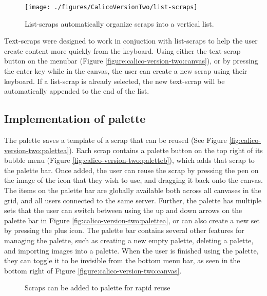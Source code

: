 \begin{figure*}[tbh]
  \centering
  \texttt{[image: ./figures/CalicoVersionTwo/list-scraps]}
  \caption{List-scraps automatically organize scraps into a vertical list.}
  \label{figure:calico-version-two:list-scraps}
\end{figure*}

Text-scraps were designed to work in conjuction with list-scraps to help the user create content more quickly from the keyboard. Using either the text-scrap button on the menubar (Figure \ref{figure:calico-version-two:canvas}), or by pressing the enter key while in the canvas, the user can create a new scrap using their keyboard. If a list-scrap is already selected, the new text-scrap will be automatically appended to the end of the list.

\subsection{Implementation of palette}

The palette saves a template of a scrap that can be reused (See Figure \ref{fig:calico-version-two:palettea}). Each scrap contains a palette button on the top right of its bubble menu (Figure \ref{fig:calico-version-two:paletteb}), which adds that scrap to the palette bar. Once added, the user can reuse the scrap by pressing the pen on the image of the icon that they wish to use, and dragging it back onto the canvas. The items on the palette bar are globally available both across all canvases in the grid, and all users connected to the same server. Further, the palette has multiple sets that the user can switch between using the up and down arrows on the palette bar in Figure \ref{fig:calico-version-two:palettea}, or can also create a new set by pressing the plus icon. The palette bar contains several other features for managing the palette, such as creating a new empty palette, deleting a palette, and importing images into a palette. When the user is finished using the palette, they can toggle it to be invisible from the bottom menu bar, as seen in the bottom right of Figure \ref{figure:calico-version-two:canvas}.

\begin{figure}
  \centering
   \caption {Scraps can be added to palette for rapid reuse}
   \label{fig:calico-version-two:palette}
\end{figure}


